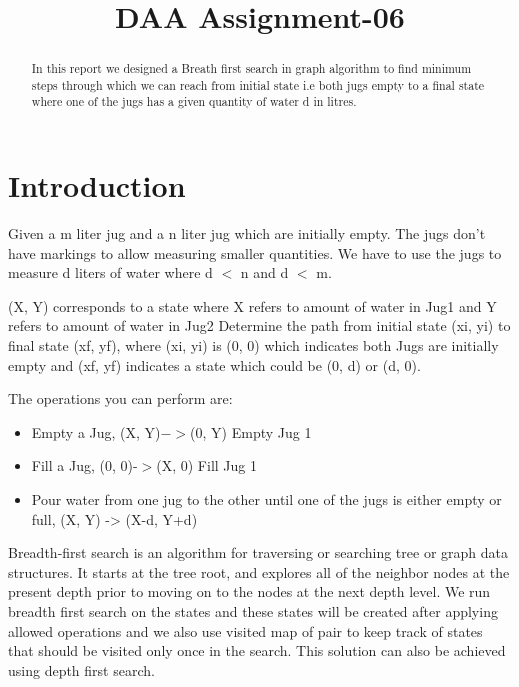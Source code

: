 \documentclass[conference]{IEEEtran}
\begin{document}
\title{DAA Assignment-06\\
}

\author{
\and
{}
\and
{}
}

\maketitle

\begin{abstract}
In this report we designed a Breath first search in graph algorithm to find minimum steps through which we can reach from initial state i.e both jugs empty
to a final state where one of the jugs has a given quantity of water d in litres.

\end{abstract}

\section{Introduction}
Given a m liter jug and a n liter jug which are initially empty. The jugs don’t have markings to allow measuring smaller quantities. We have to use the jugs to measure d liters of water where d $<$ n and d $<$ m.

(X, Y) corresponds to a state where X refers to amount of water in Jug1 and Y refers to amount of water in Jug2 
Determine the path from initial state (xi, yi) to final state (xf, yf), where (xi, yi) is (0, 0) which indicates both Jugs are initially empty and (xf, yf) indicates a state which could be (0, d) or (d, 0).

The operations you can perform are: 
\begin{itemize}
\item Empty a Jug, (X, Y)$->$(0, Y) Empty Jug 1
\item Fill a Jug, (0, 0)-$>$(X, 0) Fill Jug 1
\item Pour water from one jug to the other until one of the jugs is either empty or full, (X, Y) -> (X-d, Y+d)
\end{itemize}
Breadth-first search is an algorithm for traversing or searching tree or graph data structures. It starts at the tree root, and explores all of the neighbor nodes at the present depth prior to moving on to the nodes at the next depth level.
We run breadth first search on the states and these states will be created after applying allowed operations and we also use visited map of pair to keep track of states that should be visited only once in the search. This solution can also be achieved using depth first search.
\end{document}

